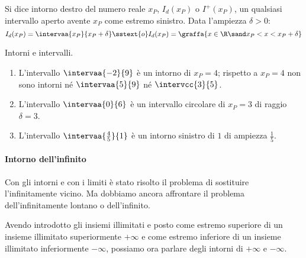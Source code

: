 \begin{newdef}{}{}
Si dice intorno destro del numero reale \(x_P\), \(I_d(x_P)\) o 
\(I^+(x_P)\), un qualsiasi intervallo aperto avente \(x_P\) come estremo 
sinistro. 
Data l'ampiezza \(\delta > 0\):
\[I_d(x_P) = \intervaa{x_P}{x_P+\delta} \sstext{o} 
  I_d(x_P) = \graffa{x \in \R \sand x_P < x < x_P+\delta}\]
\end{newdef}

\begin{center}  \end{center}



\begin{esempio} Intorni e intervalli.
\begin{enumerate}[label=\alph*)]
\item L'intervallo \(\intervaa{-2}{9}\) è un intorno di \(x_P=4\); rispetto 
a 
\(x_P=4\) non sono intorni né \(\intervaa{5}{9}\) né \(\intervcc{3}{5}\).
\item L'intervallo \(\intervaa{0}{6}\) è un intervallo circolare di 
\(x_P=3\) 
di raggio \(\delta=3\).
\item L'intervallo \(\intervaa{\frac{4}{5}}{1}\) è un intorno sinistro di 
\(1\) di ampiezza \(\frac{1}{5}\). 
\end{enumerate}
\end{esempio}

\paragraph{Intorno dell'infinito}

Con gli intorni e con i limiti è stato risolto il problema di sostituire 
l'infinitamente vicino.
Ma dobbiamo ancora affrontare il problema dell'infinitamente lontano o 
dell'infinito.

Avendo introdotto gli insiemi illimitati e posto come estremo 
superiore di un insieme illimitato superiormente \(+\infty\) e come estremo 
inferiore di un insieme illimitato inferiormente \(-\infty\), possiamo ora 
parlare degli intorni di \(+\infty\) e \(-\infty\).

